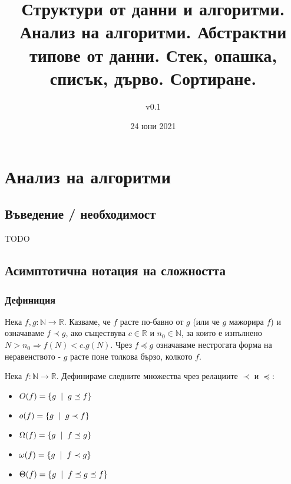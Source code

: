 \documentclass[fleqn,12pt]{article}
\title{Структури от данни и алгоритми. Анализ на алгоритми. Абстрактни
типове от данни. Стек, опашка, списък, дърво. Сортиране.}
\author{v0.1}
\date{24 юни 2021}
\begin{document}
\maketitle

\tableofcontents

\section{Анализ на алгоритми}
\subsection{Въведение / необходимост}
TODO

\subsection{Асимптотична нотация на сложността}
\subsubsection{Дефиниция}
Нека $f, g : \mathbb{N} \rightarrow \mathbb{R}$. Казваме, че $f$ расте по-бавно от $g$ (или че $g$ мажорира $f$) и означаваме $f \prec g$, ако 
съществува $c \in \mathbb{R}$ и $n_0 \in \mathbb{N}$, за които е изпълнено $N > n_0 \Rightarrow f(N) < c.g(N)$.
Чрез $f \preceq g$ означаваме нестрогата форма на неравенството - $g$ расте поне толкова бързо, колкото $f$.

Нека $f : \mathbb{N} \rightarrow \mathbb{R}$. Дефинираме следните множества чрез релациите $\prec$ и $\preceq$:
\begin{itemize}
    \item $O(f) = \{g \hspace{2mm} | \hspace{2mm} g \preceq f\}$
    \item $o(f) = \{g \hspace{2mm} | \hspace{2mm} g \prec f\}$
    \item $\Omega(f) = \{g \hspace{2mm} | \hspace{2mm} f \preceq g\}$
    \item $\omega(f) = \{g \hspace{2mm} | \hspace{2mm} f \prec g\}$
    \item $\Theta(f) = \{g \hspace{2mm} | \hspace{2mm} f \preceq g \preceq f\}$
\end{itemize}
\end{document}
